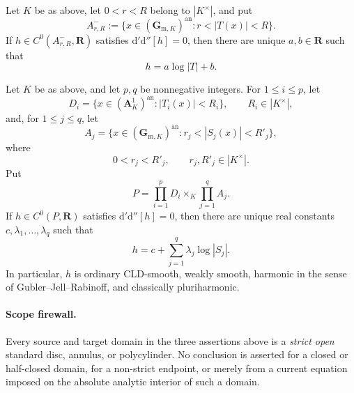 
\begin{proposition}\label{prop:p062-arbitrary-field-annulus-v4-source-correct}
Let \(K\) be as above, let \(0<r<R\) belong to \(|K^\times|\), and put
\[
 A^-_{r,R}:=\{x\in(\mathbf G_{\mathrm m,K})^{\mathrm{an}}:
                         r<|T(x)|<R\}.
\]
If \(h\in C^0(A^-_{r,R},\mathbf R)\) satisfies
\(
 \mathrm d'\mathrm d''[h]=0
\), then there are unique \(a,b\in\mathbf R\) such that
\begin{equation}\label{eq:p062-annulus-affine-v4-source-correct}
                         h=a\log|T|+b.
\end{equation}
\end{proposition}

\begin{theorem}\label{thm:p062-arbitrary-field-polycylinder-v4-source-correct}
Let \(K\) be as above, and let \(p,q\) be nonnegative integers. For
\(1\leq i\leq p\), let
\[
 D_i=\{x\in(\mathbf A^1_K)^{\mathrm{an}}:|T_i(x)|<R_i\},
 \qquad R_i\in|K^\times|,
\]
and, for \(1\leq j\leq q\), let
\[
 A_j=\{x\in(\mathbf G_{\mathrm m,K})^{\mathrm{an}}:
                  r_j<|S_j(x)|<R'_j\},
\]
where
\[
                  0<r_j<R'_j,
 \qquad r_j,R'_j\in|K^\times|.
\]
Put
\[
                         P=\prod_{i=1}^pD_i\times_K
                           \prod_{j=1}^qA_j.
\]
If \(h\in C^0(P,\mathbf R)\) satisfies
\(
 \mathrm d'\mathrm d''[h]=0
\), then there are unique real constants
\(c,\lambda_1,\ldots,\lambda_q\) such that
\begin{equation}\label{eq:p062-polycylinder-affine-v4-source-correct}
                   h=c+\sum_{j=1}^q\lambda_j\log|S_j|.
\end{equation}
In particular, \(h\) is ordinary CLD-smooth, weakly smooth, harmonic in
the sense of Gubler--Jell--Rabinoff, and classically pluriharmonic.
\end{theorem}

\paragraph{Scope firewall.}
Every source and target domain in the three assertions above is a
\emph{strict open} standard disc, annulus, or polycylinder.  No conclusion
is asserted for a closed or half-closed domain, for a non-strict endpoint,
or merely from a current equation imposed on the absolute analytic
interior of such a domain.
